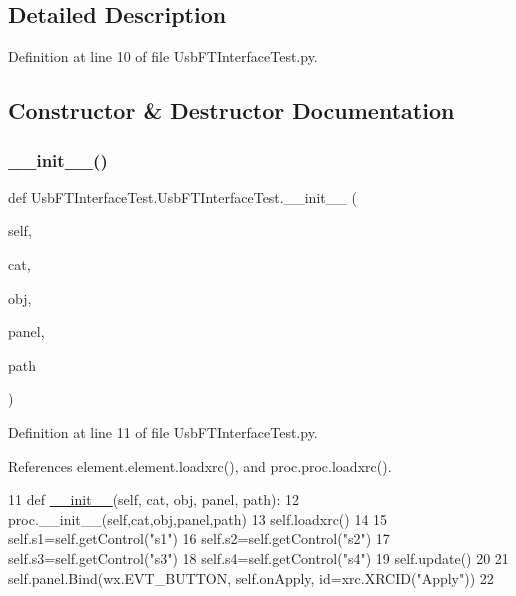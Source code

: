 \subsection{Detailed Description}


Definition at line 10 of file Usb\+F\+T\+Interface\+Test.\+py.



\subsection{Constructor \& Destructor Documentation}
\mbox{\label{classUsbFTInterfaceTest_1_1UsbFTInterfaceTest_ac4cc8069058c3e2930c0149b6af84718}} 
\subsubsection{\texorpdfstring{\+\_\+\+\_\+init\+\_\+\+\_\+()}{\_\_init\_\_()}}
{\footnotesize\ttfamily def Usb\+F\+T\+Interface\+Test.\+Usb\+F\+T\+Interface\+Test.\+\_\+\+\_\+init\+\_\+\+\_\+ (\begin{DoxyParamCaption}\item[{}]{self,  }\item[{}]{cat,  }\item[{}]{obj,  }\item[{}]{panel,  }\item[{}]{path }\end{DoxyParamCaption})}



Definition at line 11 of file Usb\+F\+T\+Interface\+Test.\+py.



References element.\+element.\+loadxrc(), and proc.\+proc.\+loadxrc().


\begin{DoxyCode}
11     \textcolor{keyword}{def }\hyperlink{classwrapper_1_1ModuleDictWrapper_a9a7a794150502f51df687831583e13b9}{\_\_init\_\_}(self, cat, obj, panel, path):
12         proc.\_\_init\_\_(self,cat,obj,panel,path)
13         self.loadxrc()
14 
15         self.s1=self.getControl(\textcolor{stringliteral}{"s1"})
16         self.s2=self.getControl(\textcolor{stringliteral}{"s2"})
17         self.s3=self.getControl(\textcolor{stringliteral}{"s3"})
18         self.s4=self.getControl(\textcolor{stringliteral}{"s4"})
19         self.update()
20 
21         self.panel.Bind(wx.EVT\_BUTTON, self.onApply, id=xrc.XRCID(\textcolor{stringliteral}{"Apply"}))
22 
\end{DoxyCode}



